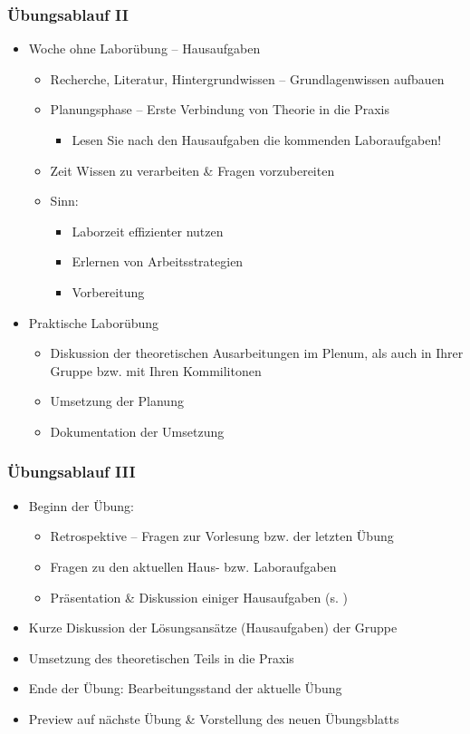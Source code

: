 \documentclass[xcolor=dvipsnames,aspectratio=169]{beamer}
\begin{document}
\begin{frame}
	\frametitle{Übungsablauf II}
	\vspace{-0.8cm}
	\begin{itemize}
		\item Woche ohne Laborübung -- Hausaufgaben
		\begin{itemize}
			\item Recherche, Literatur, Hintergrundwissen -- Grundlagenwissen aufbauen
			\item Planungsphase -- Erste Verbindung von Theorie in die Praxis
			\begin{itemize}
				\item Lesen Sie nach den Hausaufgaben die kommenden Laboraufgaben!
			\end{itemize}
			\item Zeit Wissen zu verarbeiten \& Fragen vorzubereiten
			\item Sinn:
			\begin{itemize}
				\item Laborzeit effizienter nutzen
				\item Erlernen von Arbeitsstrategien
				\item Vorbereitung
			\end{itemize}
		\end{itemize}
		\item Praktische Laborübung
		\begin{itemize}
			\item Diskussion der theoretischen Ausarbeitungen im Plenum, als auch in Ihrer Gruppe bzw. mit Ihren Kommilitonen
			\item Umsetzung der Planung
			\item Dokumentation der Umsetzung
		\end{itemize}
	\end{itemize}
\end{frame}

\begin{frame}
	\frametitle{Übungsablauf III}
	\begin{itemize}
		\item Beginn der Übung:
		\begin{itemize}
			\item Retrospektive -- Fragen zur Vorlesung bzw. der letzten Übung
			\item Fragen zu den aktuellen Haus- bzw. Laboraufgaben 
			\item Präsentation \& Diskussion einiger Hausaufgaben (s. )
		\end{itemize}
		\item Kurze Diskussion der Lösungsansätze (Hausaufgaben) der Gruppe
		\item Umsetzung des theoretischen Teils in die Praxis
		\item Ende der Übung: Bearbeitungsstand der aktuelle Übung
		\item Preview auf nächste Übung \& Vorstellung des neuen Übungsblatts  
	\end{itemize}
\end{frame}
\end{document}
